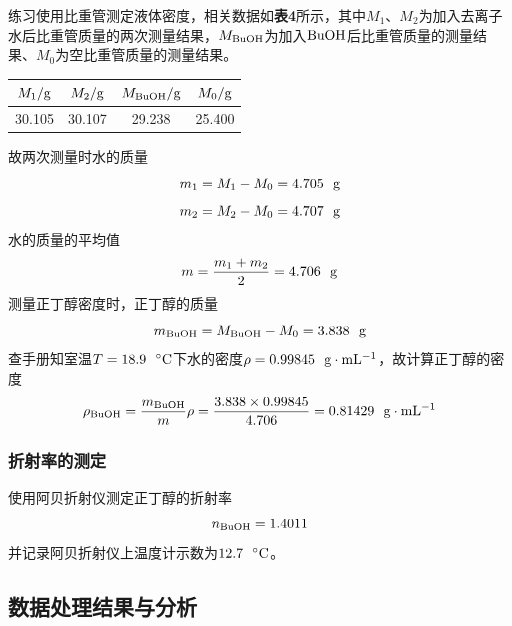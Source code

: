 \documentclass[12pt]{article}
\begin{document}
练习使用比重管测定液体密度，相关数据如\textbf{表4}所示，其中$M_{1}$、$M_{2}$为加入去离子水后比重管质量的两次测量结果，$M_{\rm BuOH}$为加入$\rm BuOH$后比重管质量的测量结果、$M_{0}$为空比重管质量的测量结果。
\begin{table}[h]
	\centering
	\begin{tabular}{cccc}
		\toprule
		$M_{1}/{\rm g}$ & $M_{2}/{\rm g}$ & $M_{\rm BuOH}/{\rm g}$ & $M_{0}/{\rm g}$ \\
		\midrule
		30.105 & 30.107 & 29.238 & 25.400 \\
		\bottomrule
	\end{tabular}
\end{table}
\par
故两次测量时水的质量
$$m_{1}=M_{1}-M_{0}=4.705\ \ {\rm g}$$
$$m_{2}=M_{2}-M_{0}=4.707\ \ {\rm g}$$
水的质量的平均值$$m=\frac{m_{1}+m_{2}}{2}=4.706\ \ {\rm g}$$
测量正丁醇密度时，正丁醇的质量
$$m_{\rm BuOH}=M_{\rm BuOH}-M_{0}=3.838\ \ {\rm g}$$
查手册知室温$T=18.9\ \ {\rm ^{\circ}C}$下水的密度$\rho=0.99845\ \ {\rm g\cdot mL^{-1}}$，故计算正丁醇的密度
$$
\rho_{\rm BuOH}=\frac{m_{\rm BuOH}}{m}\rho=\frac{3.838\times 0.99845}{4.706}=0.81429\ \ {\rm g\cdot mL^{-1}}
$$


\subsubsection{折射率的测定}
使用阿贝折射仪测定正丁醇的折射率
$$
n_{\rm BuOH}=1.4011
$$
并记录阿贝折射仪上温度计示数为$12.7\ \ {\rm ^{\circ}C}$。

\vbox{}


 \subsection{数据处理结果与分析}
\end{document}
